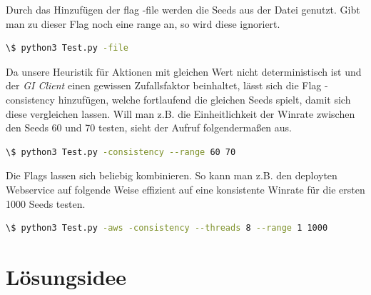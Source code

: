 \documentclass{article}
\newcommand{\gquote}[1]{\glqq #1\grqq} %
\let\oldgls\gls
\renewcommand{\gls}[1]{\emph{\oldgls{#1}}} %
\begin{document}
Durch das Hinzufügen der flag \gquote{-file} werden die Seeds aus der Datei genutzt. Gibt man zu dieser Flag noch eine \gquote{range} an, so wird diese ignoriert.
\begin{lstlisting}[language=bash, basicstyle=\footnotesize, numbers=none]
  \$ python3 Test.py -file
\end{lstlisting}
Da unsere Heuristik für Aktionen mit gleichen Wert nicht deterministisch ist und der \gls{GI Client} einen gewissen Zufallsfaktor beinhaltet, lässt sich die Flag \gquote{-consistency} hinzufügen, welche fortlaufend die gleichen Seeds spielt, damit sich diese vergleichen lassen. Will man z.B. die Einheitlichkeit der Winrate zwischen den Seeds 60 und 70 testen, sieht der Aufruf folgendermaßen aus.
\begin{lstlisting}[language=bash, basicstyle=\footnotesize, numbers=none]
  \$ python3 Test.py -consistency --range 60 70
\end{lstlisting}
Die Flags lassen sich beliebig kombinieren. So kann man z.B. den deployten Webservice auf folgende Weise effizient auf eine konsistente Winrate für die ersten 1000 Seeds testen.
\begin{lstlisting}[language=bash, basicstyle=\footnotesize, numbers=none]
  \$ python3 Test.py -aws -consistency --threads 8 --range 1 1000
\end{lstlisting}
\newpage

\section{Lösungsidee}
\end{document}
